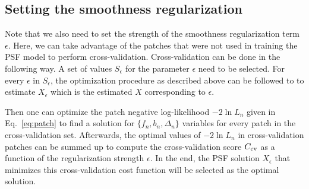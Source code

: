 \documentclass[onecolumn]{aastex61}
\begin{document}
\subsection{Setting the smoothness regularization}

Note that we also need to set the strength of the smoothness regularization term $\epsilon$. Here, we can take advantage of the patches that were not used 
in training the PSF model to perform cross-validation. Cross-validation can be done in the following way. A set of values $S_{\epsilon}$ for the parameter $\epsilon$ need to be selected. For every $\epsilon$ in $S_{\epsilon}$, the optimization procedure as described above can be followed to to estimate $X_{\epsilon}$ which is the estimated $X$ corresponding to $\epsilon$. 

Then one can optimize the patch negative log-likelihood $-2\ln L_n$ given in Eq.~\ref{eq:patch} to find a solution for $\{f_n,b_n,\Delta_n\}$
variables for every patch in the cross-validation set. Afterwards, the optimal values of $-2\ln L_n$ in cross-validation patches can be summed up to 
compute the cross-validation score $C_{\rm cv}$ as a function of the regularization strength $\epsilon$.
In the end, the PSF solution $X_{\epsilon}$ that minimizes this cross-validation cost function will be selected as the optimal solution.


%


\end{document}
